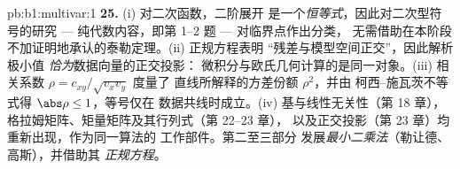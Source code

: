 \begin{solution}{pb:b1:multivar:1}
\textbf{25.} (i) 对二次函数，二阶展开
是一个\emph{恒等式}，因此对二次型符号的研究
--- 纯代数内容，即第 1--2 题 --- 对临界点作出分类，
无需借助在本阶段不加证明地承认的泰勒定理。(ii) 正规方程表明
“残差与模型空间正交”，因此解析
极小值 \emph{恰为}数据向量的正交投影：
微积分与欧氏几何计算的是同一对象。(iii)
相关系数 $\rho = c_{xy}/\sqrt{v_xv_y}$ 度量了
直线所解释的方差份额 $\rho^2$，并由
柯西–施瓦茨不等式得 $\abs\rho \leq 1$，等号仅在
数据共线时成立。(iv) 基与线性无关性（第 18 章），
格拉姆矩阵、矩量矩阵及其行列式（第 22--23 章），
以及正交投影（第 23 章）均重新出现，作为同一算法的
工作部件。第二至三部分
发展\emph{最小二乘法}（勒让德、高斯），并借助其
\emph{正规方程}。
\end{solution}
